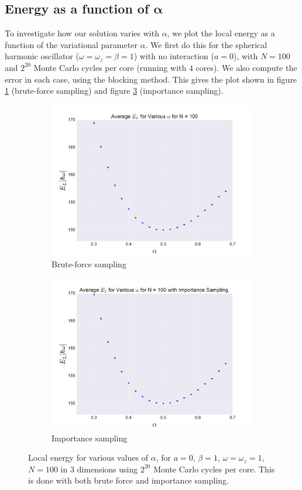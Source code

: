 \documentclass[a4paper, 10pt]{article}
\begin{document}
	\subsection{Energy as a function of $\boldsymbol{\alpha}$}
	To investigate how our solution varies with $\alpha$, we plot the local energy as a function of the variational parameter $\alpha$. We first do this for the spherical harmonic oscillator ($\omega=\omega_z=\beta=1$) with no interaction ($a=0$), with $N=100$ and $2^{20}$ Monte Carlo cycles per core (running with $4$ cores). We also compute the error in each case, using the blocking method. This gives the plot shown in figure \ref{fig:Average_EL_N=100_brute_force} (brute-force sampling) and figure \ref{fig:Average_EL_N=100_importance} (importance sampling).\\
	\pagebreak	
		\begin{figure}[ht!]
			\centering
				\begin{subfigure}{1\textwidth}
					\centering
					\includegraphics[width=.8\linewidth]{../Results/N100ax20/EvAlphaN100.pdf}
					\caption{Brute-force sampling}\label{fig:Average_EL_N=100_brute_force}
				\end{subfigure}
				\begin{subfigure}{1\textwidth}
					\centering
					\includegraphics[width=.8\linewidth]{../Results/N100ax20/EvAlphaN100IS.pdf}
					\caption{Importance sampling}\label{fig:Average_EL_N=100_importance}
				\end{subfigure}
			\caption{Local energy for various values of $\alpha$, for $a=0$, $\beta=1$, $\omega=\omega_z=1$, $N=100$ in 3 dimensions using $2^{20}$ Monte Carlo cycles per core. This is done with both brute force and importance sampling.}
		\end{figure}
\end{document}
